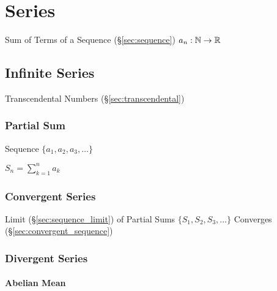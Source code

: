 


\section{Series}\label{sec:series}

Sum of Terms of a Sequence (\S\ref{sec:sequence}) $a_n : \mathbb{N}
\rightarrow \mathbb{R}$



\subsection{Infinite Series}\label{sec:infinite_series}

Transcendental Numbers (\S\ref{sec:transcendental})



\subsubsection{Partial Sum}\label{sec:partial_sum}

Sequence $\{ a_1, a_2, a_3, \ldots \}$

$S_n = \sum_{k=1}^n a_k$



\subsubsection{Convergent Series}\label{sec:convergent_series}

Limit (\S\ref{sec:sequence_limit}) of Partial Sums $\{ S_1, S_2, S_3,
\ldots \}$ Converges (\S\ref{sec:convergent_sequence})



\subsubsection{Divergent Series}\label{sec:divergent_series}

\paragraph{Abelian Mean}\label{sec:abelian_mean}\hfill

